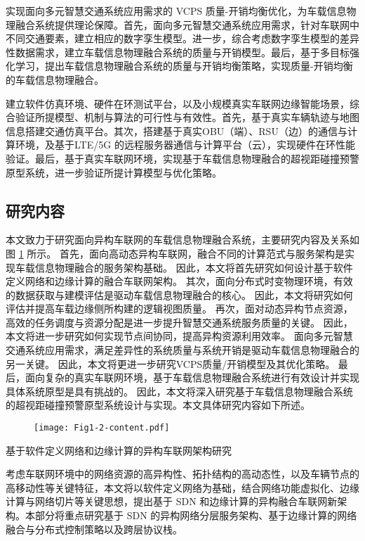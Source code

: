  实现面向多元智慧交通系统应用需求的 VCPS 质量-开销均衡优化，为车载信息物理融合系统提供理论保障。首先，面向多元智慧交通系统应用需求，针对车联网中不同交通要素，建立相应的数字孪生模型。进一步，综合考虑数字孪生模型的差异性数据需求，建立车载信息物理融合系统的质量与开销模型。最后，基于多目标强化学习，提出车载信息物理融合系统的质量与开销均衡策略，实现质量-开销均衡的车载信息物理融合。

 建立软件仿真环境、硬件在环测试平台，以及小规模真实车联网边缘智能场景，综合验证所提模型、机制与算法的可行性与有效性。首先，基于真实车辆轨迹与地图信息搭建交通仿真平台。其次，搭建基于真实OBU（端）、RSU（边）的通信与计算环境，及基于LTE/5G 的远程服务器通信与计算平台（云），实现硬件在环性能验证。最后，基于真实车联网环境，实现基于车载信息物理融合的超视距碰撞预警原型系统，进一步验证所提计算模型与优化策略。

\subsection{研究内容}

本文致力于研究面向异构车联网的车载信息物理融合系统，主要研究内容及关系如图 \ref{fig 1-2} 所示。
首先，面向高动态异构车联网，融合不同的计算范式与服务架构是实现车载信息物理融合的服务架构基础。
因此，本文将首先研究如何设计基于软件定义网络和边缘计算的融合车联网架构。
其次，面向分布式时变物理环境，有效的数据获取与建模评估是驱动车载信息物理融合的核心。
因此，本文将研究如何评估并提高车载边缘侧所构建的逻辑视图质量。
再次，面对动态异构节点资源，高效的任务调度与资源分配是进一步提升智慧交通系统服务质量的关键。
因此，本文将进一步研究如何实现节点间协同，提高异构资源利用效率。
面向多元智慧交通系统应用需求，满足差异性的系统质量与系统开销是驱动车载信息物理融合的另一关键。
因此，本文将更进一步研究VCPS质量/开销模型及其优化策略。
最后，面向复杂的真实车联网环境，基于车载信息物理融合系统进行有效设计并实现具体系统原型是具有挑战的。
因此，本文将深入研究基于车载信息物理融合系统的超视距碰撞预警原型系统设计与实现。本文具体研究内容如下所述。

\begin{figure}[h] %
	\centering
	\texttt{[image: Fig1-2-content.pdf]}
	\label{fig 1-2}
\end{figure}

 基于软件定义网络和边缘计算的异构车联网架构研究

考虑车联网环境中的网络资源的高异构性、拓扑结构的高动态性，以及车辆节点的高移动性等关键特征，本文将以软件定义网络为基础，结合网络功能虚拟化、边缘计算与网络切片等关键思想，提出基于 SDN 和边缘计算的异构融合车联网新架构。本部分将重点研究基于 SDN 的异构网络分层服务架构、基于边缘计算的网络融合与分布式控制策略以及跨层协议栈。

